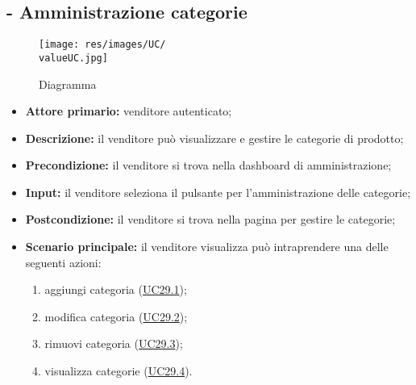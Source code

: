 \subsection{ - Amministrazione categorie}
\begin{figure}[H]
    \centering
    \texttt{[image: res/images/UC/\\valueUC.jpg]}
    \caption{Diagramma }
\end{figure}
\begin{itemize}
    \item \textbf{Attore primario:} venditore autenticato;
    \item \textbf{Descrizione:}  il venditore può visualizzare e gestire le categorie di prodotto;
    \item \textbf{Precondizione:}  il venditore si trova nella dashboard di amministrazione;
    \item \textbf{Input:} il venditore seleziona il pulsante per l'amministrazione delle categorie;
    \item \textbf{Postcondizione:} il venditore si trova nella pagina per gestire le categorie;
    \item \textbf{Scenario principale:} il venditore visualizza può intraprendere una delle seguenti azioni:
          \begin{enumerate}
              \item aggiungi categoria (\hyperref[UC29.1]{UC29.1});
              \item modifica categoria (\hyperref[UC29.2]{UC29.2});
              \item rimuovi categoria (\hyperref[UC29.3]{UC29.3});
              \item visualizza categorie (\hyperref[UC29.4]{UC29.4}).
          \end{enumerate}
\end{itemize}

\stepsubUserCase
